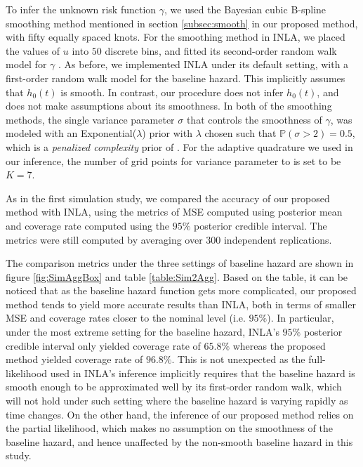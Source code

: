 \documentclass[ba]{imsart}
\begin{document}
To infer the unknown risk function $\gamma$, we used the Bayesian cubic B-spline smoothing method mentioned in section \ref{subsec:smooth} in our proposed method, with fifty equally spaced knots. For the smoothing method in INLA, we placed the values of $u$ into $50$ discrete bins, and fitted its second-order random walk model for $\gamma$ \citep{rw2}. As before, we implemented INLA under its default setting, with a first-order random walk model for the baseline hazard. This implicitly assumes that $h_{0}(t)$ is smooth. In contrast, our procedure does not infer $h_{0}(t)$, and does not make assumptions about its smoothness. In both of the smoothing methods, the single variance parameter $\sigma$ that controls the smoothness of $\gamma$, was modeled with an Exponential($\lambda$) prior with $\lambda$ chosen such that $\mathbb{P}\left( \sigma > 2\right) = 0.5$, which is a \emph{penalized complexity} prior of \cite{pcprior}. For the adaptive quadrature we used in our inference, the number of grid points for variance parameter to is set to be $K = 7$.

As in the first simulation study, we compared the accuracy of our proposed method with INLA, using the metrics of MSE computed using posterior mean and coverage rate computed using the $95\%$ posterior credible interval. The metrics were still computed by averaging over 300 independent replications.

The comparison metrics under the three settings of baseline hazard are shown in figure \ref{fig:SimAggBox} and table \ref{table:Sim2Agg}. Based on the table, it can be noticed that as the baseline hazard function gets more complicated, our proposed method tends to yield more accurate results than INLA, both in terms of smaller MSE and coverage rates closer to the nominal level (i.e. $95\%$). In particular, under the most extreme setting for the baseline hazard, INLA's $95\%$ posterior credible interval only yielded coverage rate of $65.8\%$ whereas the proposed method yielded coverage rate of $96.8\%$. This is not unexpected as the full-likelihood used in INLA's inference implicitly requires that the baseline hazard is smooth enough to be approximated well by its first-order random walk, which will not hold under such setting where the baseline hazard is varying rapidly as time changes. On the other hand, the inference of our proposed method relies on the partial likelihood, which makes no assumption on the smoothness of the baseline hazard, and hence unaffected by the non-smooth baseline hazard in this study.
\end{document}

